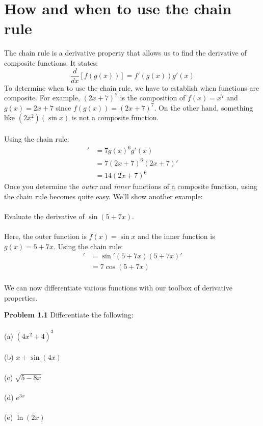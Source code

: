 \documentclass[11pt]{scrartcl}
\begin{document}
\maketitle
\noindent

\section{How and when to use the chain rule}
\noindent
The chain rule is a derivative property that allows us to find the derivative of composite functions. It states:
$$\frac{d}{dx}[f(g(x))]=f'(g(x))g'(x)$$
To determine when to use the chain rule, we have to establish when functions are composite. For example, $(2x+7)^7$ is the composition of $f(x)=x^7$ and $g(x)=2x+7$ since $f(g(x))=(2x+7)^7$. On the other hand, something like $(2x^2)(\sin x)$ is not a composite function.\\
\noindent\\
Using the chain rule:
\begin{align*}
    [(2x+7)^7]' & = 7g(x)^6g'(x)\\
                & = 7(2x+7)^6(2x+7)'\\
                & = 14(2x+7)^6
\end{align*}
Once you determine the \textit{outer} and \textit{inner} functions of a composite function, using the chain rule becomes quite easy. We'll show another example:\\
\noindent\\
Evaluate the derivative of $\sin (5+7x)$.\\
\noindent\\
Here, the outer function is $f(x)=\sin x$ and the inner function is $g(x)=5+7x$. Using the chain rule:
\begin{align*}
    [\sin (5+7x)]' & = \sin' (5+7x)(5+7x)'\\
                   & = 7\cos (5+7x)
\end{align*}\\
We can now differentiate various functions with our toolbox of derivative properties. 
\begin{tcolorbox}
[colback=purple!5!white,colframe=purple!75!black]
\textbf{Problem 1.1} Differentiate the following:\\
\noindent\\
(a) \;\;\;\;$(4x^2+4)^3$\\
\noindent\\
(b) \;\;\;\;$x+\sin (4x)$\\
\noindent\\
(c) \;\;\;\;$\sqrt {5-8x}$ \\
\noindent \\
(d) \;\;\;\;$e^{3x}$ \\
\noindent \\
(e) \;\;\;\;$\ln(2x)$
\end{tcolorbox}
\end{document}
